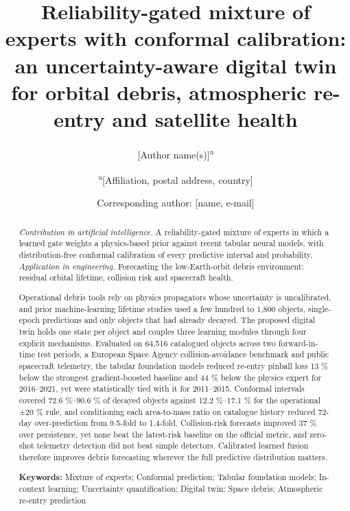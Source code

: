 \documentclass[3p,times]{elsarticle}
\begin{document}
\begin{frontmatter}

\title{Reliability-gated mixture of experts with conformal calibration:
an uncertainty-aware digital twin for orbital debris, atmospheric
re-entry and satellite health}

\author{{[}Author name(s){]}\textsuperscript{a}}
\author{\textsuperscript{a}{[}Affiliation, postal address, country{]}}
\author{Corresponding author: {[}name, e-mail{]}}

\begin{abstract}
\emph{Contribution in artificial intelligence.} A reliability-gated
mixture of experts in which a learned gate weights a physics-based prior
against recent tabular neural models, with distribution-free conformal
calibration of every predictive interval and probability.
\emph{Application in engineering.} Forecasting the low-Earth-orbit
debris environment: residual orbital lifetime, collision risk and
spacecraft health.

Operational debris tools rely on physics propagators whose uncertainty
is uncalibrated, and prior machine-learning lifetime studies used a few
hundred to 1,800 objects, single-epoch predictions and only objects that
had already decayed. The proposed digital twin holds one state per
object and couples three learning modules through four explicit
mechanisms. Evaluated on 64,516 catalogued objects across two
forward-in-time test periods, a European Space Agency
collision-avoidance benchmark and public spacecraft telemetry, the
tabular foundation models reduced re-entry pinball loss 13 \% below the
strongest gradient-boosted baseline and 44 \% below the physics expert
for 2016--2021, yet were statistically tied with it for 2011--2015.
Conformal intervals covered 72.6 \%--90.6 \% of decayed objects against
12.2 \%--17.1 \% for the operational ±20 \% rule, and conditioning each
area-to-mass ratio on catalogue history reduced 72-day over-prediction
from 9.5-fold to 1.4-fold. Collision-risk forecasts improved 37 \% over
persistence, yet none beat the latest-risk baseline on the official
metric, and zero-shot telemetry detection did not beat simple detectors.
Calibrated learned fusion therefore improves debris forecasting wherever
the full predictive distribution matters.

\textbf{Keywords:} Mixture of experts; Conformal prediction; Tabular
foundation models; In-context learning; Uncertainty quantification;
Digital twin; Space debris; Atmospheric re-entry prediction
\end{abstract}


\end{frontmatter}
\end{document}
